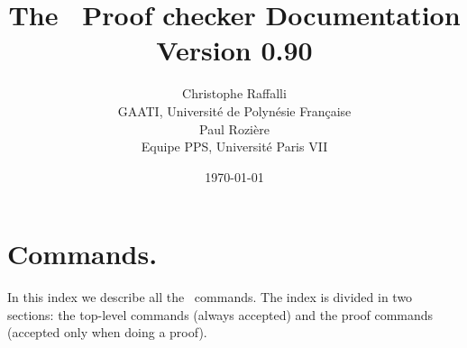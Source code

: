 \documentclass[twoside,11pt,a4paper]{book}
\title{The \AFD\ Proof checker Documentation \\
                {\footnotesize Version 0.90}}
\date{\today}
\author{Christophe Raffalli \\
        GAATI, Université de Polynésie Française\\
        Paul Rozière\\
        Equipe PPS, Université Paris VII
}
\begin{document}
\maketitle

\tableofcontents





















\appendix

\chapter{Commands.}\label{cmd}

In this index we describe all the \AFD\ commands. The index is divided in two
sections: the top-level commands (always accepted) and the proof commands
(accepted only when doing a proof).











\end{document}
